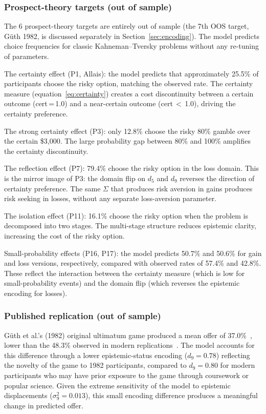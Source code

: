 \documentclass[journal]{IEEEtran}
\begin{document}
\subsubsection{Prospect-theory targets (out of sample)}

The 6 prospect-theory targets are entirely out of sample (the 7th OOS target, G\"{u}th 1982, is discussed separately in Section~\ref{sec:encoding}).
The model predicts choice frequencies for classic Kahneman--Tversky problems without any re-tuning of parameters.

The certainty effect (P1, Allais): the model predicts that approximately 25.5\% of participants choose the risky option, matching the observed rate.
The certainty measure (equation~\eqref{eq:certainty}) creates a cost discontinuity between a certain outcome (cert\,=\,1.0) and a near-certain outcome (cert\,$<$\,1.0), driving the certainty preference.

The strong certainty effect (P3): only 12.8\% choose the risky 80\% gamble over the certain \$3,000.
The large probability gap between 80\% and 100\% amplifies the certainty discontinuity.

The reflection effect (P7): 79.4\% choose the risky option in the loss domain.
This is the mirror image of P3: the domain flip on $d_5$ and $d_9$ reverses the direction of certainty preference.
The same $\Sigma$ that produces risk aversion in gains produces risk seeking in losses, without any separate loss-aversion parameter.

The isolation effect (P11): 16.1\% choose the risky option when the problem is decomposed into two stages.
The multi-stage structure reduces epistemic clarity, increasing the cost of the risky option.

Small-probability effects (P16, P17): the model predicts 50.7\% and 50.6\% for gain and loss versions, respectively, compared with observed rates of 57.4\% and 42.8\%.
These reflect the interaction between the certainty measure (which is low for small-probability events) and the domain flip (which reverses the epistemic encoding for losses).

\subsubsection{Published replication (out of sample)}

G\"uth et al.'s (1982) original ultimatum game produced a mean offer of 37.0\%~\cite{guth1982}, lower than the 48.3\% observed in modern replications~\cite{fraser2020}.
The model accounts for this difference through a lower epistemic-status encoding ($d_9 = 0.78$) reflecting the novelty of the game to 1982 participants, compared to $d_9 = 0.80$ for modern participants who may have prior exposure to the game through coursework or popular science.
Given the extreme sensitivity of the model to epistemic displacements ($\sigma_9^2 = 0.013$), this small encoding difference produces a meaningful change in predicted offer.
\end{document}

